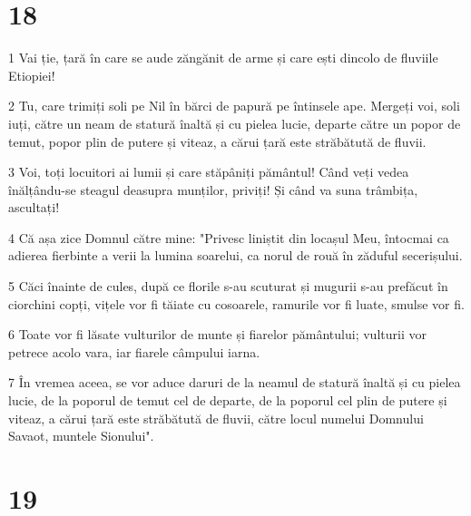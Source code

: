 \chapter{18}

\par 1 Vai ție, țară în care se aude zăngănit de arme și care ești dincolo de fluviile Etiopiei!
\par 2 Tu, care trimiți soli pe Nil în bărci de papură pe întinsele ape. Mergeți voi, soli iuți, către un neam de statură înaltă și cu pielea lucie, departe către un popor de temut, popor plin de putere și viteaz, a cărui țară este străbătută de fluvii.
\par 3 Voi, toți locuitori ai lumii și care stăpâniți pământul! Când veți vedea înălțându-se steagul deasupra munților, priviți! Și când va suna trâmbița, ascultați!
\par 4 Că așa zice Domnul către mine: "Privesc liniștit din locașul Meu, întocmai ca adierea fierbinte a verii la lumina soarelui, ca norul de rouă în zăduful secerișului.
\par 5 Căci înainte de cules, după ce florile s-au scuturat și mugurii s-au prefăcut în ciorchini copți, vițele vor fi tăiate cu cosoarele, ramurile vor fi luate, smulse vor fi.
\par 6 Toate vor fi lăsate vulturilor de munte și fiarelor pământului; vulturii vor petrece acolo vara, iar fiarele câmpului iarna.
\par 7 În vremea aceea, se vor aduce daruri de la neamul de statură înaltă și cu pielea lucie, de la poporul de temut cel de departe, de la poporul cel plin de putere și viteaz, a cărui țară este străbătută de fluvii, către locul numelui Domnului Savaot, muntele Sionului".

\chapter{19}

